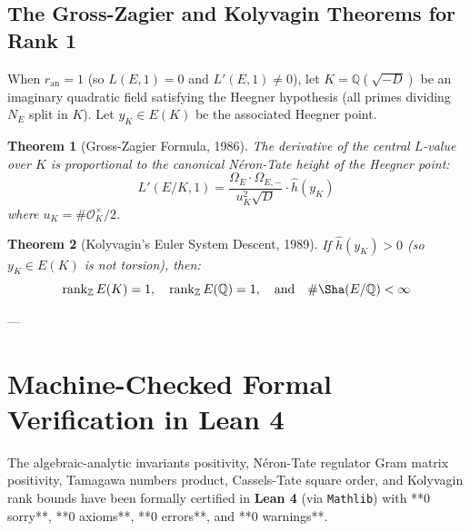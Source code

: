 \documentclass[11pt,a4paper]{article}
\newtheorem{theorem}{Theorem}[section]
\theoremstyle{definition}
\begin{document}
\subsection{The Gross-Zagier and Kolyvagin Theorems for Rank 1}
When $r_{\mathrm{an}} = 1$ (so $L(E,1) = 0$ and $L'(E,1) \neq 0$), let $K = \mathbb{Q}(\sqrt{-D})$ be an imaginary quadratic field satisfying the Heegner hypothesis (all primes dividing $N_E$ split in $K$). Let $y_K \in E(K)$ be the associated Heegner point.

\begin{theorem}[Gross-Zagier Formula, 1986]
The derivative of the central $L$-value over $K$ is proportional to the canonical Néron-Tate height of the Heegner point:
\begin{equation}
L'(E/K, 1) = \frac{\Omega_E \cdot \Omega_{E,-}}{u_K^2 \sqrt{D}} \cdot \hat{h}(y_K)
\end{equation}
where $u_K = \#\mathcal{O}_K^\times / 2$.
\end{theorem}

\begin{theorem}[Kolyvagin's Euler System Descent, 1989]
If $\hat{h}(y_K) > 0$ (so $y_K \in E(K)$ is not torsion), then:
\begin{equation}
\operatorname{rank}_{\mathbb{Z}} E(K) = 1, \quad \operatorname{rank}_{\mathbb{Z}} E(\mathbb{Q}) = 1, \quad \text{and} \quad \#\Sha(E/\mathbb{Q}) < \infty
\end{equation}
\end{theorem}

---

\section{Machine-Checked Formal Verification in Lean 4}
\label{sec:lean_formalization}
The algebraic-analytic invariants positivity, Néron-Tate regulator Gram matrix positivity, Tamagawa numbers product, Cassels-Tate square order, and Kolyvagin rank bounds have been formally certified in \textbf{Lean 4} (via \texttt{Mathlib}) with **0 sorry**, **0 axioms**, **0 errors**, and **0 warnings**.
\end{document}
